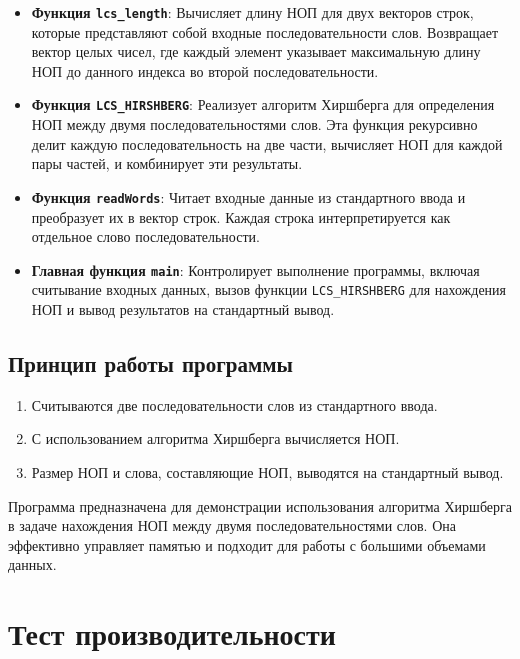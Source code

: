 \documentclass[12pt]{article}
\begin{document}
\begin{itemize}
    \item \textbf{Функция \texttt{lcs\_length}}: Вычисляет длину НОП для двух векторов строк, которые представляют собой входные последовательности слов. Возвращает вектор целых чисел, где каждый элемент указывает максимальную длину НОП до данного индекса во второй последовательности.
    \item \textbf{Функция \texttt{LCS\_HIRSHBERG}}: Реализует алгоритм Хиршберга для определения НОП между двумя последовательностями слов. Эта функция рекурсивно делит каждую последовательность на две части, вычисляет НОП для каждой пары частей, и комбинирует эти результаты.
    \item \textbf{Функция \texttt{readWords}}: Читает входные данные из стандартного ввода и преобразует их в вектор строк. Каждая строка интерпретируется как отдельное слово последовательности.
    \item \textbf{Главная функция \texttt{main}}: Контролирует выполнение программы, включая считывание входных данных, вызов функции \texttt{LCS\_HIRSHBERG} для нахождения НОП и вывод результатов на стандартный вывод.
\end{itemize}

\subsection{Принцип работы программы}

\begin{enumerate}
    \item Считываются две последовательности слов из стандартного ввода.
    \item С использованием алгоритма Хиршберга вычисляется НОП.
    \item Размер НОП и слова, составляющие НОП, выводятся на стандартный вывод.
\end{enumerate}

Программа предназначена для демонстрации использования алгоритма Хиршберга в задаче нахождения НОП между двумя последовательностями слов. Она эффективно управляет памятью и подходит для работы с большими объемами данных.






\section{Тест производительности}
\end{document}
